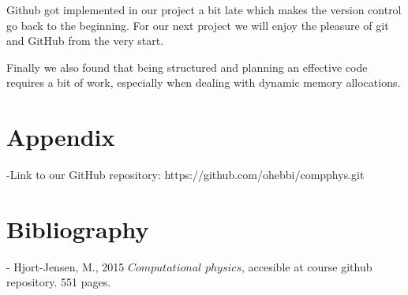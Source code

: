 \documentclass[%
oneside,                 %
final,                   %
10pt]{article}
\begin{document}
Github got implemented in our project a bit late which makes the version control go back to the beginning. For our next project we will enjoy the pleasure of git and GitHub from the very start.

Finally we also found that being structured and planning an effective code requires a bit of work, especially when dealing with dynamic memory allocations.

\section{Appendix}

-Link to our GitHub repository:
https://github.com/ohebbi/compphys.git

\section{Bibliography}

- Hjort-Jensen, M., 2015 $Computational$ $physics$, accesible at course github repository. 551 pages.
\end{document}
